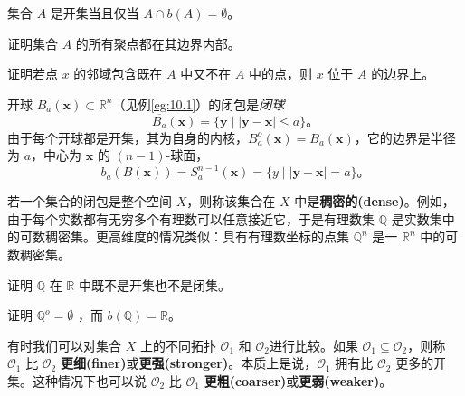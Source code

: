 \begin{exercise}
	集合 $A$ 是开集当且仅当 $A\cap b(A)=\emptyset $。
\end{exercise}

\begin{exercise}
	证明集合 $A$ 的所有聚点都在其边界内部。
\end{exercise} 

\begin{exercise}
	证明若点 $x$ 的邻域包含既在 $A$ 中又不在 $A$ 中的点，则 $x$ 位于 $A$ 的边界上。
\end{exercise}

\begin{eg}\label{eg:10.5}
	开球 $B_{a} (\mathbf{x} )\subset \mathbb{R}^{n}$（见例\ref{eg:10.1}）的闭包是\emph{闭球}
\begin{equation*}
    \overline{B_{a}} (\mathbf{x} )=\{\mathbf{y} \mid | \mathbf{y} -\mathbf{x}| \leq a\}。
\end{equation*}
由于每个开球都是开集，其为自身的内核，$B_{a}^{o} (\mathbf{x} )=B_{a} (\mathbf{x} )$，它的边界是半径为 $a$，中心为 $\mathbf{x}$ 的 $(n-1)$-球面，
\begin{equation*}
b_{a} (B(\mathbf{x} ))=S_{a}^{n-1} (\mathbf{x} )=\{y\mid | \mathbf{y} -\mathbf{x}| =a\}。
\end{equation*}
\end{eg}

\begin{eg}\label{eg:10.6}
	若一个集合的闭包是整个空间 $X$，则称该集合在 $X$ 中是\textbf{稠密的(dense)}。例如，由于每个实数都有无穷多个有理数可以任意接近它，于是有理数集 $\mathbb{Q}$ 是实数集中的可数稠密集。更高维度的情况类似：具有有理数坐标的点集 $\mathbb{Q}^{n}$ 是一 $\mathbb{R}^{n}$ 中的可数稠密集。
\end{eg}

\begin{exercise}
	证明 $\mathbb{Q}$ 在 $\mathbb{R}$ 中既不是开集也不是闭集。
\end{exercise}

\begin{exercise}
	证明 $\mathbb{Q}^{o} =\emptyset $ ，而 $b(\mathbb{Q}) =\mathbb{R}$。
\end{exercise}

	有时我们可以对集合 $X$ 上的不同拓扑 $\mathcal{O}_{1}$ 和 $\mathcal{O}_{2}$进行比较。如果 $\mathcal{O}_{1} \subseteq \mathcal{O}_{2}$，则称 $\mathcal{O}_{1}$ 比 $\mathcal{O}_{2}$ \textbf{更细(finer)}或\textbf{更强(stronger)}。本质上是说，$\mathcal{O}_{1}$ 拥有比 $\mathcal{O}_{2}$ 更多的开集。这种情况下也可以说 $\mathcal{O}_{2}$ 比 $\mathcal{O}_{1}$ \textbf{更粗(coarser)}或\textbf{更弱(weaker)}。

